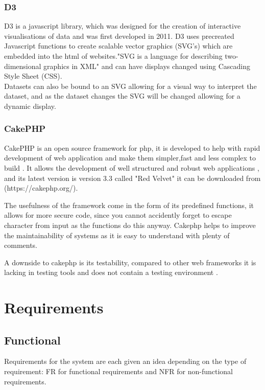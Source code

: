 \documentclass[12pt]{article}  %
\begin{document}
\subsubsection{D3}
D3 \cite{bostock_d3.js_????} is a javascript library, which was designed for the creation of interactive visualisations of data and was first developed in 2011. D3 uses precreated Javascript functions to create scalable vector graphics (SVG's) which are embedded into the html of websites."SVG is a language for describing two-dimensional graphics in XML"\cite{ferraiolo_scalable_2000} and can have displays changed  using Cascading Style Sheet (CSS).  \\
Datasets can also be bound to an SVG allowing for a visual way to interpret the dataset, and as the dataset changes the SVG will be changed allowing for a dynamic display.

\subsubsection{CakePHP}
CakePHP is an open source framework for php, it is developed to help with rapid development of web application and make them simpler,fast and less complex to build \cite{_cakephp_????}. It allows the development of well structured and robust web applications \cite{plekhanova_evaluating_2009}, and its latest version is version 3.3 called "Red Velvet" it can be downloaded from (https://cakephp.org/).

The usefulness of the framework come in the form of its predefined functions, it allows for more secure code, since you cannot accidently forget to escape character from input as the functions do this anyway. Cakephp helps to improve the maintainability of systems as it is easy to understand with plenty of comments.

A downside to cakephp is its testability, compared to other web frameworks it is lacking in testing tools and does not contain a testing environment \cite{plekhanova_evaluating_2009}.



\newpage
\section{Requirements}
\label{section:require}
 


\subsection{Functional}
Requirements for the system are each given an idea depending on the type of requirement: FR for functional requirements and NFR for non-functional requirements.
\end{document}
